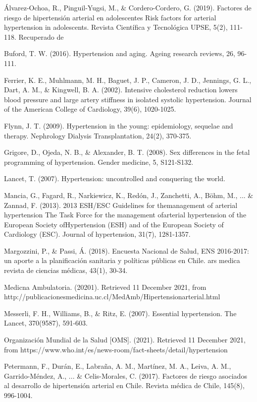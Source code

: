 \documentclass{aa}
\begin{document}
\tiny
\begin{hangparas}{.25in}{1}

Álvarez-Ochoa, R., Pinguil-Yugsi, M., \& Cordero-Cordero, G. (2019). Factores de riesgo de hipertensión arterial en adolescentes Risk factors for arterial hypertension in adolescents. Revista Científica y Tecnológica UPSE, 5(2), 111-118. Recuperado de

Buford, T. W. (2016). Hypertension and aging. Ageing research reviews, 26, 96-111.

Ferrier, K. E., Muhlmann, M. H., Baguet, J. P., Cameron, J. D., Jennings, G. L., Dart, A. M., \& Kingwell, B. A. (2002). Intensive cholesterol reduction lowers blood pressure and large artery stiffness in isolated systolic hypertension. Journal of the American College of Cardiology, 39(6), 1020-1025.

Flynn, J. T. (2009). Hypertension in the young: epidemiology, sequelae and therapy. Nephrology Dialysis Transplantation, 24(2), 370-375.

Grigore, D., Ojeda, N. B., \& Alexander, B. T. (2008). Sex differences in the fetal programming of hypertension. Gender medicine, 5, S121-S132.

Lancet, T. (2007). Hypertension: uncontrolled and conquering the world.

Mancia, G., Fagard, R., Narkiewicz, K., Redón, J., Zanchetti, A., Böhm, M., ... \& Zannad, F. (2013). 2013 ESH/ESC Guidelines for themanagement of arterial hypertension The Task Force for the management ofarterial hypertension of the European Society ofHypertension (ESH) and of the European Society of Cardiology (ESC). Journal of hypertension, 31(7), 1281-1357.

Margozzini, P., \& Passi, Á. (2018). Encuesta Nacional de Salud, ENS 2016-2017: un aporte a la planificación sanitaria y políticas públicas en Chile. ars medica revista de ciencias médicas, 43(1), 30-34.

Medicna Ambulatoria. (20201). Retrieved 11 December 2021, from http://publicacionesmedicina.uc.cl/MedAmb/Hipertensionarterial.html %

Messerli, F. H., Williams, B., \& Ritz, E. (2007). Essential hypertension. The Lancet, 370(9587), 591-603.

Organización Mundial de la Salud [OMS]. (2021). Retrieved 11 December 2021, from https://www.who.int/es/news-room/fact-sheets/detail/hypertension

Petermann, F., Durán, E., Labraña, A. M., Martínez, M. A., Leiva, A. M., Garrido-Méndez, A., ... \& Celis-Morales, C. (2017). Factores de riesgo asociados al desarrollo de hipertensión arterial en Chile. Revista médica de Chile, 145(8), 996-1004.


\end{hangparas}
\end{document}
